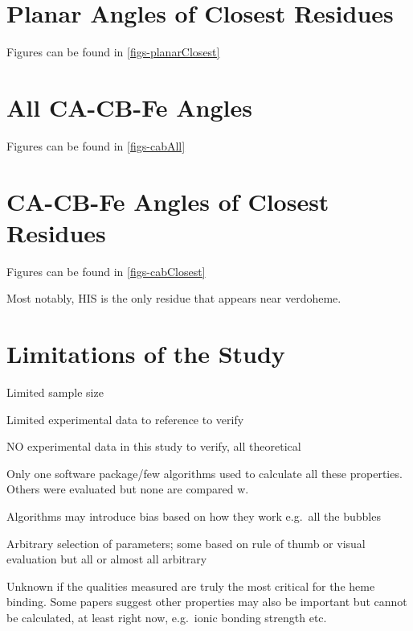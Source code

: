 \documentclass[a4paper, nobind]{templates/ociamthesis}
\begin{document}
\hypertarget{planar-angles-of-closest-residues}{%
\section{Planar Angles of Closest Residues}\label{planar-angles-of-closest-residues}}

Figures can be found in \ref{figs-planarClosest}

\hypertarget{all-ca-cb-fe-angles}{%
\section{All CA-CB-Fe Angles}\label{all-ca-cb-fe-angles}}

Figures can be found in \ref{figs-cabAll}

\hypertarget{ca-cb-fe-angles-of-closest-residues}{%
\section{CA-CB-Fe Angles of Closest Residues}\label{ca-cb-fe-angles-of-closest-residues}}

Figures can be found in \ref{figs-cabClosest}

Most notably, HIS is the only residue that appears near verdoheme.

\hypertarget{limitations-of-the-study}{%
\section{Limitations of the Study}\label{limitations-of-the-study}}

Limited sample size

Limited experimental data to reference to verify

NO experimental data in this study to verify, all theoretical

Only one software package/few algorithms used to calculate all these properties. Others were evaluated but none are compared w.

Algorithms may introduce bias based on how they work e.g.~all the bubbles

Arbitrary selection of parameters; some based on rule of thumb or visual evaluation but all or almost all arbitrary

Unknown if the qualities measured are truly the most critical for the heme binding. Some papers suggest other properties may also be important but cannot be calculated, at least right now, e.g.~ionic bonding strength etc.
\end{document}
